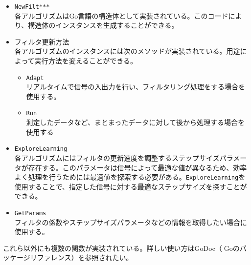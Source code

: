 \begin{itemize}
\tightlist
\item
  \texttt{NewFilt***} \\ 
  各アルゴリズムはGo言語の構造体として実装されている。このコードにより、構造体のインスタンスを生成することができる。
\item
  フィルタ更新方法 \\
  各アルゴリズムのインスタンスには次のメソッドが実装されている。用途によって実行方法を変えることができる。

  \begin{itemize}
  \tightlist
  \item
    \texttt{Adapt} \\
    リアルタイムで信号の入出力を行い、フィルタリング処理をする場合を使用する。
  \item
    \texttt{Run} \\
    測定したデータなど、まとまったデータに対して後から処理する場合を使用する
  \end{itemize}
\item
  \texttt{ExploreLearning} \\
  各アルゴリズムにはフィルタの更新速度を調整するステップサイズパラメータが存在する。このパラメータは信号によって最適な値が異なるため、効率よく処理を行うためには最適値を探索する必要がある。\texttt{ExploreLearning}を使用することで、指定した信号に対する最適なステップサイズを探すことができる。
\item
  \texttt{GetParams} \\
  フィルタの係数やステップサイズパラメータなどの情報を取得したい場合に使用する。
\end{itemize}

これら以外にも複数の関数が実装されている。詳しい使い方はGoDoc（Goのパッケージリファレンス）\cite{godoc:online}を参照されたい。
